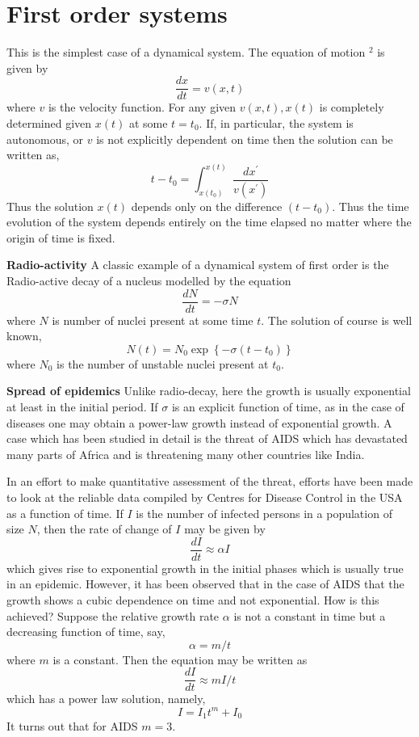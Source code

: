 \section{ First order systems}
This is the simplest case of a dynamical system. The equation of motion $^{2}$ is given by
$$
\frac{d x}{d t}=v(x, t)
$$
where $v$ is the velocity function. For any given $v(x, t), x(t)$ is completely determined given $x(t)$ at some $t=t_{0} .$ If, in particular, the system is autonomous, or $v$ is not explicitly dependent on time then the solution can be written as,
$$
t-t_{0}=\int_{x\left(t_{0}\right)}^{x(t)} \frac{d x^{\prime}}{v\left(x^{\prime}\right)}
$$
Thus the solution $x(t)$ depends only on the difference $\left(t-t_{0}\right)$. Thus the time evolution of the system depends entirely on the time elapsed no matter where the origin of time is fixed.
\begin{example} \textbf{ Radio-activity }
 A classic example of a dynamical system of first order is the Radio-active decay of a nucleus modelled by the equation
 $$
 \frac{d N}{d t}=-\sigma N
 $$
 where $N$ is number of nuclei present at some time $t$. The solution of course is well known,
 $$
 N(t)=N_{0} \exp \left\{-\sigma\left(t-t_{0}\right)\right\}
 $$
 where $N_{0}$ is the number of unstable nuclei present at $t_{0}$.
\end{example}
\begin{example}\textbf{ Spread of epidemics}
	Unlike radio-decay, here the growth is usually exponential at least in the initial period. If $\sigma$ is an explicit function of time, as in the case of diseases one may obtain a power-law growth instead of exponential growth. A case which has been studied in detail is the threat of AIDS which has devastated many parts of Africa and is threatening many other countries like India.
	
	In an effort to make quantitative assessment of the threat, efforts have been made to look at the reliable data compiled by Centres for Disease Control in the USA as a function of time. If $I$ is the number of infected persons in a population of size $N$, then the rate of change of $I$ may be given by
	$$\frac{d I}{d t} \approx \alpha I$$
	which gives rise to exponential growth in the initial phases which is usually true in an epidemic. However, it has been observed that in the case of AIDS that the growth shows a cubic dependence on time and not exponential. How is this achieved? Suppose the relative growth rate $\alpha$ is not a constant in time but a decreasing function of time, say,
	$$
	\alpha=m / t
	$$
	where $m$ is a constant. Then the equation may be written as
	$$
	\frac{d I}{d t} \approx m I / t
	$$
	which has a power law solution, namely,
	$$
	I=I_{1} t^{m}+I_{0}
	$$
	It turns out that for AIDS $m=3$.
\end{example}
